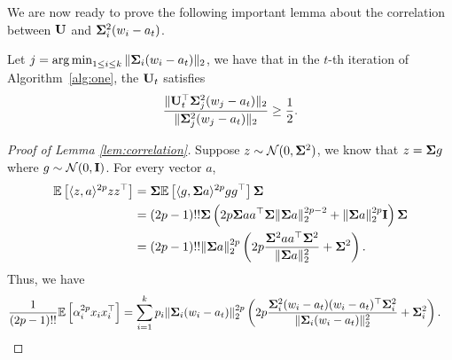 We are now ready to prove the following important lemma about the correlation between $\bold{U}$ and $\bold{\Sigma}_i^2(w_i - a_t)$.

\begin{lemma}\label{lem:correlation}
Let $j = \operatorname*{arg\,min}_{1\le i\le k}  \|\bold{\Sigma}_i (w_i - a_t) \|_2$, we have that in the $t$-th iteration of Algorithm~\ref{alg:one}, the $\bold{U}_t$ satisfies
\begin{align}
\frac{\|\bold{U}_t^{\top} \bold{\Sigma}_j^2 (w_j - a_t) \|_2}{\| \bold{\Sigma}_j^2 (w_j - a_t)  \|_2 } \geq \frac{1}{2}.
\end{align}

\end{lemma}
\begin{proof}[Proof of Lemma \ref{lem:correlation}]
Suppose $z \sim \mathcal{N}(0, \bold{\Sigma}^2)$, we know that $z = \bold{\Sigma} g$ where $g \sim \mathcal{N}(0, \bold{I})$. For every vector $a$,
\begin{align}
\mathbb{E}\left[\langle z, a \rangle^{2p} z z^{\top}\right] &= \bold{\Sigma} \mathbb{E}\left[ \langle g, \bold{\Sigma} a \rangle^{2p} g g^{\top}\right]  \bold{\Sigma}
\\
&=  (2p - 1)!! \bold{\Sigma} \left( 2p  \bold{\Sigma} a a^{\top} \bold{\Sigma} \| \bold{\Sigma} a\|_2^{2p - 2}  + \| \bold{\Sigma} a \|_2^{2p} \bold{I} \right) \bold{\Sigma}
\\
& =   (2p - 1)!!  \| \bold{\Sigma} a\|_2^{2p} \left( 2p \frac{ \bold{\Sigma}^2 a a^{\top} \bold{\Sigma}^2 }{ \|\bold{\Sigma} a \|_2^2 }+  \bold{\Sigma}^2 \right).
\end{align}
Thus, we have
\begin{align}
\frac{1}{(2p - 1)!!}\mathbb{E}\left[ \alpha_i^{2p} x_i x_i^{\top} \right] &= \sum_{i = 1}^k p_i   \| \bold{\Sigma}_i (w_i - a_t)\|_2^{2p} \left( 2p \frac{ \bold{\Sigma}_i^2 (w_i - a_t) (w_i - a_t)^{\top} \bold{\Sigma}_i^2 }{ \|\bold{\Sigma}_i (w_i - a_t) \|_2^2 }+  \bold{\Sigma}_i^2 \right).
\end{align}



\end{proof}
